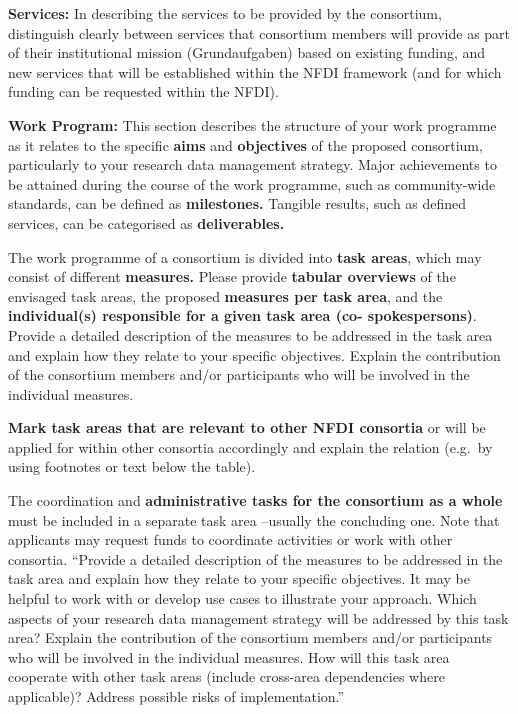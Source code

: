 \documentclass[
  english,
  paper=a4,
  oneside,captions=tableheading
]{scrbook}
\renewenvironment{quote}{\begin{customblockquote}\list{}{\rightmargin=0em\leftmargin=0em}%
\item\relax\color{blockquote-text}\ignorespaces}{\unskip\unskip\endlist\end{customblockquote}}
\begin{document}
\begin{quote}
\textbf{Services:} In describing the services to be provided by the
consortium, distinguish clearly between services that consortium members
will provide as part of their institutional mission (Grundaufgaben)
based on existing funding, and new services that will be established
within the NFDI framework (and for which funding can be requested within
the NFDI).
\end{quote}

\begin{quote}
\textbf{Work Program:} This section describes the structure of your work
programme as it relates to the specific \textbf{aims} and
\textbf{objectives} of the proposed consortium, particularly to your
research data management strategy. Major achievements to be attained
during the course of the work programme, such as community-wide
standards, can be defined as \textbf{milestones.} Tangible results, such
as defined services, can be categorised as \textbf{deliverables.}
\end{quote}

\begin{quote}
The work programme of a consortium is divided into \textbf{task areas},
which may consist of different \textbf{measures.} Please provide
\textbf{tabular overviews} of the envisaged task areas, the proposed
\textbf{measures per task area}, and the \textbf{individual(s)
responsible for a given task area (co- spokespersons)}. Provide a
detailed description of the measures to be addressed in the task area
and explain how they relate to your specific objectives. Explain the
contribution of the consortium members and/or participants who will be
involved in the individual measures.
\end{quote}

\begin{quote}
\textbf{Mark task areas that are relevant to other NFDI consortia} or
will be applied for within other consortia accordingly and explain the
relation (e.g.~by using footnotes or text below the table).
\end{quote}

\begin{quote}
The coordination and \textbf{administrative tasks for the consortium as
a whole} must be included in a separate task area --usually the
concluding one. Note that applicants may request funds to coordinate
activities or work with other consortia. ``Provide a detailed
description of the measures to be addressed in the task area and explain
how they relate to your specific objectives. It may be helpful to work
with or develop use cases to illustrate your approach. Which aspects of
your research data management strategy will be addressed by this task
area? Explain the contribution of the consortium members and/or
participants who will be involved in the individual measures. How will
this task area cooperate with other task areas (include cross-area
dependencies where applicable)? Address possible risks of
implementation.''
\end{quote}
\end{document}
